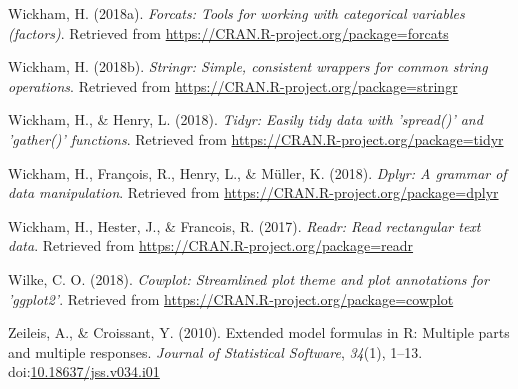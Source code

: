 \documentclass[man, fleqn, noextraspace]{apa6}
\theoremstyle{definition}
\theoremstyle{definition}
\theoremstyle{definition}
\theoremstyle{remark}
\begin{document}
\hypertarget{ref-R-forcats}{}
Wickham, H. (2018a). \emph{Forcats: Tools for working with categorical
variables (factors)}. Retrieved from
\url{https://CRAN.R-project.org/package=forcats}

\hypertarget{ref-R-stringr}{}
Wickham, H. (2018b). \emph{Stringr: Simple, consistent wrappers for
common string operations}. Retrieved from
\url{https://CRAN.R-project.org/package=stringr}

\hypertarget{ref-R-tidyr}{}
Wickham, H., \& Henry, L. (2018). \emph{Tidyr: Easily tidy data with
'spread()' and 'gather()' functions}. Retrieved from
\url{https://CRAN.R-project.org/package=tidyr}

\hypertarget{ref-R-dplyr}{}
Wickham, H., François, R., Henry, L., \& Müller, K. (2018). \emph{Dplyr:
A grammar of data manipulation}. Retrieved from
\url{https://CRAN.R-project.org/package=dplyr}

\hypertarget{ref-R-readr}{}
Wickham, H., Hester, J., \& Francois, R. (2017). \emph{Readr: Read
rectangular text data}. Retrieved from
\url{https://CRAN.R-project.org/package=readr}

\hypertarget{ref-R-cowplot}{}
Wilke, C. O. (2018). \emph{Cowplot: Streamlined plot theme and plot
annotations for 'ggplot2'}. Retrieved from
\url{https://CRAN.R-project.org/package=cowplot}

\hypertarget{ref-R-Formula}{}
Zeileis, A., \& Croissant, Y. (2010). Extended model formulas in R:
Multiple parts and multiple responses. \emph{Journal of Statistical
Software}, \emph{34}(1), 1--13.
doi:\href{https://doi.org/10.18637/jss.v034.i01}{10.18637/jss.v034.i01}

\endgroup
\end{document}
